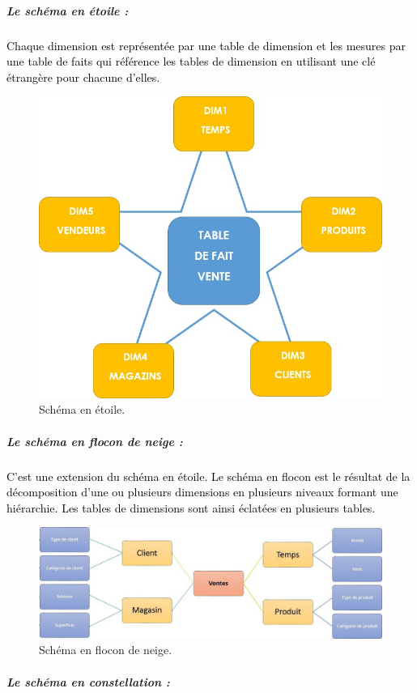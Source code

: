\documentclass[a4paper,12pt]{report}
\begin{document}
\subparagraph{Le schéma en étoile : }

\textcolor{black}{Chaque dimension est représentée par une table de dimension et les mesures par une table de faits qui référence les tables de dimension en utilisant une clé étrangère pour chacune d’elles.}

\begin{figure}[H]
\begin{center}
\includegraphics[width=0.5\linewidth]{./images/15}
\end{center}

\caption{Schéma en étoile.\citep{group16fg}
}
\label{fig:15}

\end{figure}


\subparagraph{Le schéma en flocon de neige :}

\textcolor{black}{C’est une extension du schéma en étoile. Le schéma en flocon est le résultat de la décomposition d’une ou plusieurs dimensions en plusieurs niveaux formant une hiérarchie. Les tables de dimensions sont ainsi éclatées en plusieurs tables.}

\begin{figure}[H]
\begin{center}
\includegraphics[width=0.7\linewidth]{./images/16}
\end{center}

\caption{Schéma en flocon de neige.\citep{group16fg}
}
\label{fig:16}

\end{figure}




\subparagraph{Le schéma en constellation :}
\end{document}

